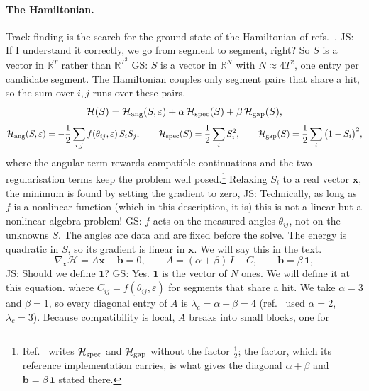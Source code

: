 \documentclass[11pt,a4paper]{article}
\newcommand{\js}[1]{{\color{blue} JS: #1 }}
\newcommand{\gs}[1]{{\color{orange!85!black} GS: #1 }}
\newcommand{\R}{\mathbb{R}}
\begin{document}
\paragraph{The Hamiltonian.}
Track finding is the search for the ground state of the Hamiltonian of 
refs.~\cite{nicotra2023,trackhhl}, \js{If I understand it correctly, we go from segment to segment, right? So $S$ is a vector in $\R^T$ rather than $\R^{T^2}$} \gs{$S$ is a vector in $\R^N$ with $N\approx4T^2$, one entry per candidate segment. The Hamiltonian couples only segment pairs that share a hit, so the sum over $i,j$ runs over these pairs.} 
\begin{equation}
\mathcal{H}(S)=\mathcal{H}_{\rm ang}(S,\varepsilon)+\alpha\,\mathcal{H}_{\rm spec}(S)+\beta\,\mathcal{H}_{\rm gap}(S),
\end{equation}
\begin{equation}
\mathcal{H}_{\rm ang}(S,\varepsilon)=-\frac12\sum_{i,j}f(\theta_{ij},\varepsilon)\,S_iS_j,\qquad
\mathcal{H}_{\rm spec}(S)=\frac12\sum_i S_i^2,\qquad
\mathcal{H}_{\rm gap}(S)=\frac12\sum_i\big(1-S_i\big)^2 ,
\end{equation}
where the angular term rewards compatible continuations and the two regularisation terms keep
the problem well posed.\footnote{Ref.~\cite{trackhhl} writes $\mathcal{H}_{\rm spec}$ and
$\mathcal{H}_{\rm gap}$ without the factor $\frac12$; the factor, which its reference
implementation carries, is what gives the diagonal $\alpha+\beta$ and $\mathbf{b}=\beta\,\mathbf{1}$
stated there.} Relaxing $S_i$ to a real vector $\mathbf{x}$, the minimum is found by setting the
gradient to zero, \js{Technically, as long as $f$ is a nonlinear function (which in this description, it is) this is not a linear but a nonlinear algebra problem!} \gs{$f$ acts on the measured angles $\theta_{ij}$, not on the unknowns $S$. The angles are data and are fixed before the solve. The energy is quadratic in $S$, so its gradient is linear in $\mathbf{x}$. We will say this in the text.}
\begin{equation}
\label{eq:Axb}
\nabla_{\mathbf{x}}\mathcal{H}=A\mathbf{x}-\mathbf{b}=0,\qquad A=(\alpha+\beta)\,I-C,\qquad \mathbf{b}=\beta\,\mathbf{1},
\end{equation}
\js{Should we define $\mathbf{1}$?} \gs{Yes. $\mathbf{1}$ is the vector of $N$ ones. We will define it at this equation.}
where $C_{ij}=f(\theta_{ij},\varepsilon)$ for segments that share a hit. We take $\alpha=3$ and
$\beta=1$, so every diagonal entry of $A$ is $\lambda_c=\alpha+\beta=4$ (ref.~\cite{trackhhl} used
$\alpha=2$, $\lambda_c=3$). Because compatibility is local, $A$ breaks into small blocks, one for
\end{document}
